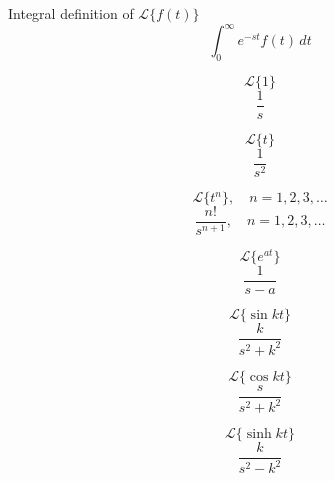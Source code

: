 \documentclass[grid, poker_landscape]{flashcards}
\begin{document}


  \begin{flashcard}{ Integral definition of $ \mathcal{L} \{ f(t) \} $ }
    \[
      \int_0^\infty e^{-st} f(t) \, dt
    \]
  \end{flashcard}



  \begin{flashcard}{ \[ \mathcal{L} \{ 1 \} \] }
    \[
      \frac{1}{s}
    \]
  \end{flashcard}

  \begin{flashcard}{ \[ \mathcal{L} \{ t \} \] }
    \[
      \frac{ 1 }{ s^2 }
    \]
  \end{flashcard}

  \begin{flashcard}{ \[ \mathcal{L} \{ t^n \}, \quad n=1,2,3,\ldots \] }
    \[
      \frac{ n! }{ s^{n + 1} }, \quad n=1,2,3,\ldots
    \]
  \end{flashcard}

  \begin{flashcard}{ \[ \mathcal{L} \{ e^{at} \} \] }
    \[
      \frac{ 1 }{ s - a }
    \]
  \end{flashcard}

  \begin{flashcard}{\[ \mathcal{L} \{ \sin kt \} \] }
    \[
      \frac{ k }{ s^2 + k^2 }
    \]
  \end{flashcard}

  \begin{flashcard}{ \[ \mathcal{L} \{ \cos kt \} \] }
    \[
      \frac{ s }{ s^2 + k^2 }
    \]
  \end{flashcard}

  \begin{flashcard}{ \[ \mathcal{L} \{ \sinh kt \} \] }
    \[
      \frac{ k }{ s^2 - k^2 }
    \]
  \end{flashcard}
\end{document}
